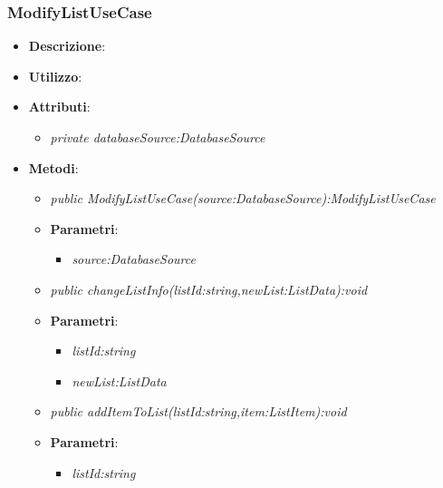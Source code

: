 \subsubsection{ModifyListUseCase}
\begin{itemize}
\item \textbf{Descrizione}: 
\item \textbf{Utilizzo}:
\item \textbf{Attributi}: 
	\begin{itemize}
	\item \textit{private databaseSource:DatabaseSource}\\
	
	\end{itemize}
\item \textbf{Metodi}:
	\begin{itemize}
	\item \textit{public ModifyListUseCase(source:DatabaseSource):ModifyListUseCase}\\
	
			\item{\textbf{Parametri}: \begin{itemize}
			\item \textit{source:DatabaseSource}\\
			
			\end{itemize}}
	
	\item \textit{public changeListInfo(listId:string,newList:ListData):void}\\

			\item{\textbf{Parametri}: \begin{itemize}
			\item \textit{listId:string}\\

			\item \textit{newList:ListData}\\

			\end{itemize}}
	\item \textit{public addItemToList(listId:string,item:ListItem):void}\\

			\item{\textbf{Parametri}: \begin{itemize}
			\item \textit{listId:string}\\


\end{itemize}}
\end{itemize}
\end{itemize}
